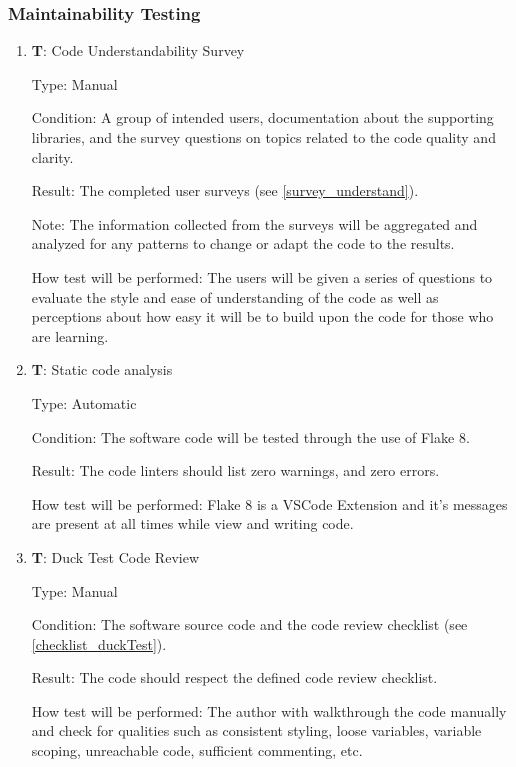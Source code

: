 \documentclass[12pt, titlepage]{article}
\newcounter{testnum} %
\begin{document}
\subsubsection{Maintainability Testing}

\begin{enumerate}

  \item{\textbf{T\thetestnum \label{T_understandSurvey}}: Code Understandability Survey\\}
            
  Type: Manual
            
  Condition: A group of intended users, 
  documentation about the supporting libraries, and the survey questions on topics related 
  to the code quality and clarity.
            
  Result: The completed user surveys (see \ref{survey_understand}).
            
  Note: The information collected from the surveys
  will be aggregated and analyzed for any patterns to
  change or adapt the code to the results.
            
  How test will be performed: The users will be given a series of questions to evaluate 
  the style and ease of understanding of the code as well as perceptions about how easy it will 
  be to build upon the code for those who are learning.

  \item{\textbf{T\thetestnum \label{T_linters}}: Static code analysis\\}

  Type: Automatic
            
  Condition: The software code will be tested through the use of Flake 8.
            
  Result: The code linters should list zero warnings, and zero errors.
            
  How test will be performed: Flake 8 is a VSCode Extension and it's messages are present at all times while 
  view and writing code.

  \item{\textbf{T\thetestnum \label{T_duckTest}}: Duck Test Code Review\\}

  Type: Manual
            
  Condition: The software source code and the code review checklist (see \ref{checklist_duckTest}).
            
  Result: The code should respect the defined code review checklist.
            
  How test will be performed: The author with walkthrough the code manually and check for qualities
    such as consistent styling, loose variables, variable scoping, unreachable code, 
    sufficient commenting, etc.
\end{enumerate}
\end{document}
